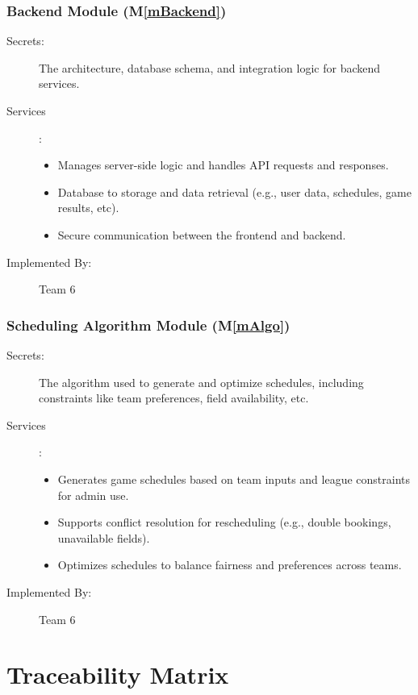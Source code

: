\documentclass[12pt, titlepage]{article}
\newcommand{\mref}[1]{M\ref{#1}}
\begin{document}
  \subsubsection{Backend Module (\mref{mBackend})}
  \begin{description}
    \item[Secrets:] The architecture, database schema, and integration logic for backend services.
    \item[Services]: 
      \begin{itemize}
        \item Manages server-side logic and handles API requests and responses.
        \item Database to storage and data retrieval (e.g., user data, schedules, game results, etc).
        \item Secure communication between the frontend and backend.
      \end{itemize}
    \item[Implemented By:] Team 6
  \end{description}

  \subsubsection{Scheduling Algorithm Module (\mref{mAlgo})}
  \begin{description}
    \item[Secrets:] The algorithm used to generate and optimize schedules, including constraints like team preferences, field availability, etc.
    \item[Services]:
      \begin{itemize}
        \item Generates game schedules based on team inputs and league constraints for admin use.
        \item Supports conflict resolution for rescheduling (e.g., double bookings, unavailable fields).
        \item Optimizes schedules to balance fairness and preferences across teams.
      \end{itemize}
    \item[Implemented By:] Team 6
  \end{description}
  
\section{Traceability Matrix} \label{SecTM}
\end{document}
